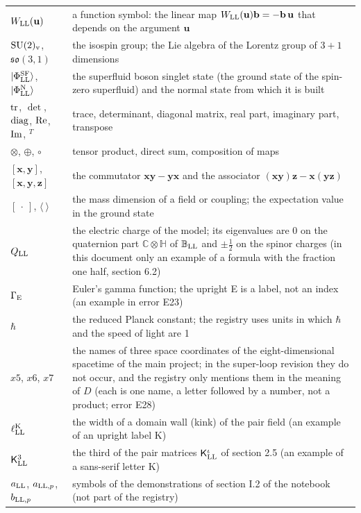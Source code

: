 \documentclass[
  10pt,
]{article}
\begin{document}
\begin{longtable}[]{@{}
  >{\raggedright\arraybackslash}p{}
  >{\raggedright\arraybackslash}p{}@{}}
\(W_{\rm LL}(\mathbf u)\) & a function symbol: the linear map
\(W_{\rm LL}(\mathbf u)\mathbf b=-\mathbf b\,\mathbf u\) that depends on
the argument \(\mathbf u\) \\
\({\rm SU}(2)_{\rm v}\), \(\mathfrak{so}(3,1)\) & the isospin group; the
Lie algebra of the Lorentz group of \(3+1\) dimensions \\
\(\lvert\Phi^{\rm SF}_{\rm LL}\rangle\),
\(\lvert\Phi^{\rm N}_{\rm LL}\rangle\) & the superfluid boson singlet
state (the ground state of the spin-zero superfluid) and the normal
state from which it is built \\
\({\rm tr}\), \(\det\), \({\rm diag}\), \({\rm Re}\), \({\rm Im}\),
\({}^T\) & trace, determinant, diagonal matrix, real part, imaginary
part, transpose \\
\(\otimes\), \(\oplus\), \(\circ\) & tensor product, direct sum,
composition of maps \\
\([\mathbf x,\mathbf y]\), \([\mathbf x,\mathbf y,\mathbf z]\) & the
commutator \(\mathbf x\mathbf y-\mathbf y\mathbf x\) and the associator
\((\mathbf x\mathbf y)\mathbf z-\mathbf x(\mathbf y\mathbf z)\) \\
\([\ \cdot\ ]\), \(\langle\ \rangle\) & the mass dimension of a field or
coupling; the expectation value in the ground state \\
\(Q_{\rm LL}\) & the electric charge of the model; its eigenvalues are 0
on the quaternion part \(\mathbb C\otimes\mathbb H\) of
\(\mathbb B_{\rm LL}\) and \(\pm\tfrac12\) on the spinor charges (in
this document only an example of a formula with the fraction one half,
section 6.2) \\
\(\Gamma_{\rm E}\) & Euler's gamma function; the upright E is a label,
not an index (an example in error E23) \\
\(\hbar\) & the reduced Planck constant; the registry uses units in
which \(\hbar\) and the speed of light are 1 \\
\(x5\), \(x6\), \(x7\) & the names of three space coordinates of the
eight-dimensional spacetime of the main project; in the super-loop
revision they do not occur, and the registry only mentions them in the
meaning of \(D\) (each is one name, a letter followed by a number, not a
product; error E28) \\
\(\ell^{\rm K}_{\rm LL}\) & the width of a domain wall (kink) of the
pair field (an example of an upright label K) \\
\(\mathsf K^3_{\rm LL}\) & the third of the pair matrices
\(\mathsf K^\iota_{\rm LL}\) of section 2.5 (an example of a sans-serif
letter K) \\
\(a_{\rm LL}\), \(a_{{\rm LL},p}\), \(b_{{\rm LL},p}\) & symbols of the
demonstrations of section I.2 of the notebook (not part of the
registry) \\
\end{longtable}
\end{document}
